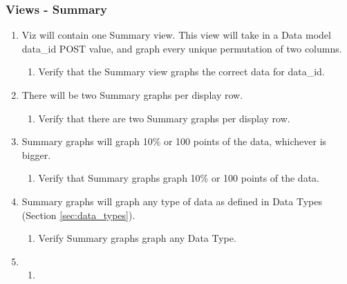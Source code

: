 \subsubsection{Views - Summary}
	\begin{enumerate}
		\item Viz will contain one Summary view. This view will take in a Data model data\_id POST value, and graph every unique permutation of two columns. 
		\begin{enumerate}
			\item Verify that the Summary view graphs the correct data for data\_id.
		\end{enumerate}

		\item There will be two Summary graphs per display row.
		\begin{enumerate}
			\item Verify that there are two Summary graphs per display row.
		\end{enumerate}

		\item Summary graphs will graph 10\% or 100 points of the data, whichever is bigger.
		\begin{enumerate}
			\item Verify that Summary graphs graph 10\% or 100 points of the data.
		\end{enumerate}

		\item Summary graphs will graph any type of data as defined in Data Types (Section \ref{sec:data_types}).
		\begin{enumerate}
			\item Verify Summary graphs graph any Data Type.
		\end{enumerate}

		\item 
		\begin{enumerate}
			\item 
		\end{enumerate}

	\end{enumerate}

